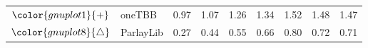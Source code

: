 \begin{tabular}{clrrrrrrr}
\rowcolor{gnuplot1!10}$\color{gnuplot1}{+}$ & oneTBB & \cellcolor{gnuplot1!10} 0.97 & \cellcolor{gnuplot1!10} 1.07 & \cellcolor{gnuplot1!10} 1.26 & \cellcolor{gnuplot1!10} 1.34 & \cellcolor{gnuplot1!10} 1.52 & \cellcolor{gnuplot1!10} 1.48 & \cellcolor{gnuplot1!10} 1.47 \\
\rowcolor{gnuplot8!10}$\color{gnuplot8}{\triangle}$ & ParlayLib & \cellcolor{gnuplot8!10} 0.27 & \cellcolor{gnuplot8!10} 0.44 & \cellcolor{gnuplot8!10} 0.55 & \cellcolor{gnuplot8!10} 0.66 & \cellcolor{gnuplot8!10} 0.80 & \cellcolor{gnuplot8!10} 0.72 & \cellcolor{gnuplot8!10} 0.71 \\
\bottomrule
\end{tabular}
